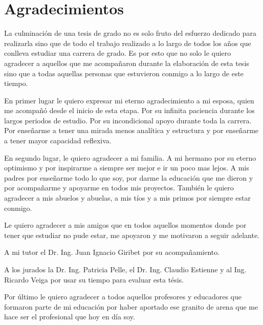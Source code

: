 \section*{\hfil Agradecimientos \hfil}

\noindent La culminación de una tesis de grado no es solo fruto del esfuerzo dedicado para realizarla sino que de todo el trabajo realizado a lo largo de todos los años que conlleva estudiar una carrera de grado. Es por esto que no solo le quiero agradecer a aquellos que me acompañaron durante la elaboración de esta tesis sino que a todas aquellas personas que estuvieron conmigo a lo largo de este tiempo.

\noindent En primer lugar le quiero expresar mi eterno agradecimiento a mi esposa, quien me acompañó desde el inicio de esta etapa. Por su infinita paciencia durante los largos periodos de estudio. Por su incondicional apoyo durante toda la carrera. Por enseñarme a tener una mirada menos analítica y estructura y por enseñarme a tener mayor capacidad reflexiva.

\noindent En segundo lugar, le quiero agradecer a mi familia. A mi hermano por su eterno optimismo y por inspirarme a siempre ser mejor e ir un poco mas lejos. A mis padres por enseñarme todo lo que soy, por darme la educación que me dieron y por acompañarme y apoyarme en todos mis proyectos. También le quiero agradecer a mis abuelos y abuelas, a mis tíos y a mis primos por siempre estar conmigo.

\noindent Le quiero agradecer a mis amigos que en todos aquellos momentos donde por tener que estudiar no pude estar, me apoyaron y me motivaron a seguir adelante.

\noindent A mi tutor el Dr. Ing. Juan Ignacio Giribet por su acompañamiento.

\noindent A los jurados la Dr. Ing. Patricia Pelle, el Dr. Ing. Claudio Estienne y al Ing. Ricardo Veiga por usar su tiempo para evaluar esta tésis.

\noindent Por último le quiero agradecer a todos aquellos profesores y educadores que formaron parte de mi educación por haber aportado ese granito de arena que me hace ser el profesional que hoy en día soy.
